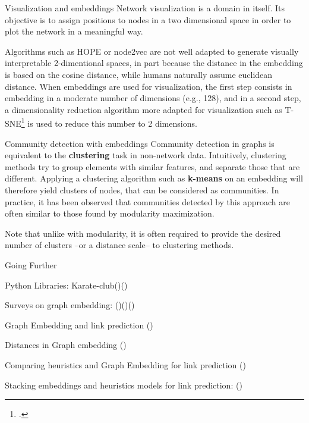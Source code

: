 \documentclass[a4paper,11pt]{book}
\begin{document}
\begin{textbox}{Visualization and embeddings}
Network visualization is a domain in itself. Its objective is to assign positions to nodes in a two dimensional space in order to plot the network in a meaningful way. 

Algorithms such as HOPE or node2vec are not well adapted to generate visually interpretable 2-dimentional spaces, in part because the distance in the embedding is based on the cosine distance, while humans naturally assume euclidean distance. When embeddings are used for visualization, the first step consists in embedding in a moderate number of dimensions (e.g., 128), and in a second step, a dimensionality reduction algorithm more adapted for visualization such as T-SNE\footcite{van2008visualizing} is used to reduce this number to 2 dimensions.
\end{textbox}


\begin{textbox}{Community detection with embeddings}
Community detection in graphs is equivalent to the \textbf{clustering} task in non-network data. Intuitively, clustering methods try to group elements with similar features, and separate those that are different. Applying a clustering algorithm such as \textbf{k-means} on an embedding will therefore yield clusters of nodes, that can be considered as communities. In practice, it has been observed that communities detected by this approach are often similar to those found by modularity maximization.

Note that unlike with modularity, it is often required to provide the desired number of clusters --or a distance scale-- to clustering methods.
\end{textbox}

\begin{textbox}{Going Further}

Python Libraries: Karate-club(\cite{karateclub})(\cite{goyal2018gem})

Surveys on graph embedding: (\cite{goyal2018graph})(\cite{cai2018comprehensive})(\cite{cui2018survey})

Graph Embedding and link prediction (\cite{mara2020benchmarking})

Distances in Graph embedding (\cite{vaudaine2020comparing})

Comparing heuristics and Graph Embedding for link prediction (\cite{sinha2018systematic})

Stacking embeddings and heuristics models for link prediction: (\cite{ghasemian2020stacking})

\end{textbox}



\end{document}
